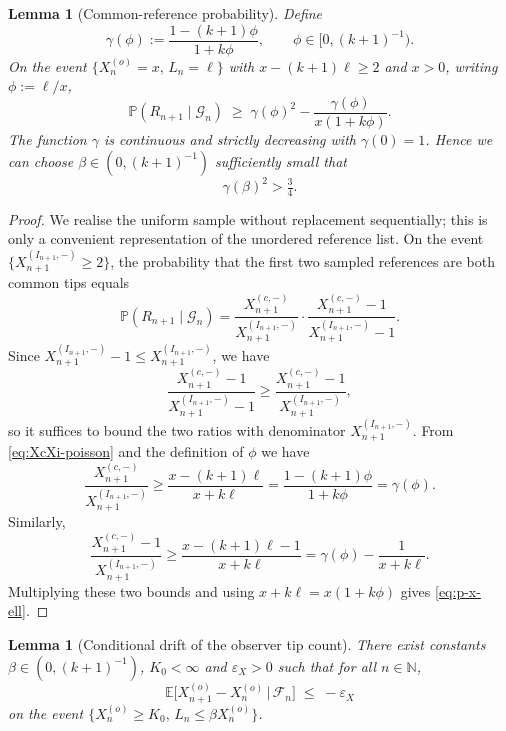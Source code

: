 \documentclass[a4paper,12pt,oneside,reqno]{amsart}
\newcommand{\N}{{\mathbb N}}
\renewcommand{\P}{{\mathbb P}}
\newcommand{\E}{{\mathbb E}}
\newcommand{\F}{{\mathcal F}}
\newcommand{\1}{{\mathbf 1}}
\newtheorem{lem}[theo]{Lemma}
\begin{document}
\begin{lem}[Common-reference probability]\label{lem:common-ref-prob}
Define
\[
   \gamma(\phi) := \frac{1-(k+1)\phi}{1+k\phi},\qquad \phi\in[0,(k+1)^{-1}).
\]
On the event $\{X_n^{(o)}=x,\,L_n=\ell\}$ with $x-(k+1)\ell\ge 2$ and $x>0$, writing $\phi:=\ell/x$,
\begin{equation}\label{eq:p-x-ell}
   \P(R_{n+1}\mid \mathcal{G}_n)
   \;\ge\; \gamma(\phi)^2 - \frac{\gamma(\phi)}{x(1+k\phi)}.
\end{equation}
The function $\gamma$ is continuous and strictly decreasing with $\gamma(0)=1$. Hence we can choose $\beta\in(0,(k+1)^{-1})$ sufficiently small that
\begin{equation}\label{eq:gamma-beta}
   \gamma(\beta)^2 > \tfrac34.
\end{equation}
\end{lem}

\begin{proof}
We realise the uniform sample without replacement sequentially; this is only a convenient representation of the unordered reference list. On the event $\{X_{n+1}^{(I_{n+1},-)}\ge2\}$, the probability that the first two sampled references are both common tips equals
\[
   \P(R_{n+1}\mid \mathcal{G}_n)
   = \frac{X_{n+1}^{(c,-)}}{X_{n+1}^{(I_{n+1},-)}}
     \cdot \frac{X_{n+1}^{(c,-)}-1}{X_{n+1}^{(I_{n+1},-)}-1}.
\]
Since $X_{n+1}^{(I_{n+1},-)}-1\le X_{n+1}^{(I_{n+1},-)}$, we have
\[
   \frac{X_{n+1}^{(c,-)}-1}{X_{n+1}^{(I_{n+1},-)}-1}
   \ge \frac{X_{n+1}^{(c,-)}-1}{X_{n+1}^{(I_{n+1},-)}},
\]
so it suffices to bound the two ratios with denominator $X_{n+1}^{(I_{n+1},-)}$. From \eqref{eq:XcXi-poisson} and the definition of $\phi$ we have
\[
   \frac{X_{n+1}^{(c,-)}}{X_{n+1}^{(I_{n+1},-)}}
   \ge \frac{x-(k+1)\ell}{x+k\ell}
   = \frac{1-(k+1)\phi}{1+k\phi}
   = \gamma(\phi).
\]
Similarly,
\[
   \frac{X_{n+1}^{(c,-)}-1}{X_{n+1}^{(I_{n+1},-)}}
   \ge \frac{x-(k+1)\ell-1}{x+k\ell}
   = \gamma(\phi) - \frac{1}{x+k\ell}.
\]
Multiplying these two bounds and using $x+k\ell = x(1+k\phi)$ gives \eqref{eq:p-x-ell}.
\end{proof}

\begin{lem}[Conditional drift of the observer tip count]\label{lem:X-drift-poisson}
There exist constants $\beta\in(0,(k+1)^{-1})$, $K_0<\infty$ and $\varepsilon_X>0$ such that for all $n\in\N$,
\begin{equation}\label{eq:X-drift-poisson}
   \E\bigl[X_{n+1}^{(o)}-X_n^{(o)} \,\big\vert\, \F_n\bigr]
   \;\le\; -\varepsilon_X
\end{equation}
on the event $\{X_n^{(o)}\ge K_0,\,L_n\le \beta X_n^{(o)}\}$.
\end{lem}
\end{document}
